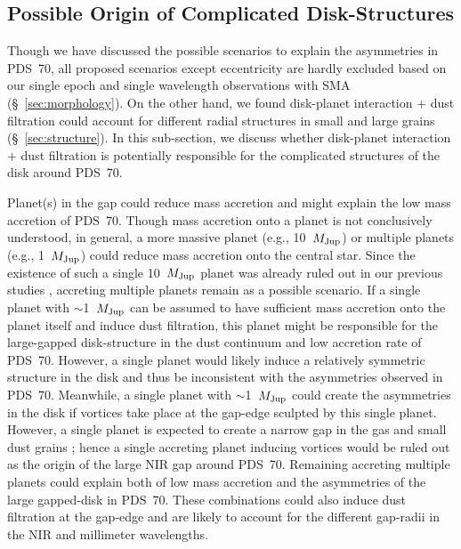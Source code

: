 \documentclass[apj]{emulateapj-rtx4}
\begin{document}
  \subsection{Possible Origin of Complicated Disk-Structures}\label{sec:origin} 

  Though we have discussed the possible scenarios to explain the asymmetries in PDS~70, all proposed scenarios 
  except eccentricity are hardly excluded based on our single epoch and single wavelength observations with SMA 
  (\S~\ref{sec:morphology}).
  On the other hand, we found disk-planet interaction $+$ dust filtration could account for different radial structures
  in small and large grains (\S~\ref{sec:structure}).
  In this sub-section, we discuss whether disk-planet interaction $+$ dust filtration is potentially responsible for
  the complicated structures of the disk around PDS~70.

  Planet(s) in the gap could reduce mass accretion and might explain the low mass accretion of PDS~70. 
  Though mass 
  accretion onto a planet is not conclusively understood, in general, a more massive planet (e.g., 10~$M_{\rm Jup}$) 
  or multiple planets (e.g., 1~$M_{\rm Jup}$) could reduce mass accretion onto the central star. 
  Since the existence of such a single 10~$M_{\rm Jup}$ planet was already ruled out in our previous studies \citep{hash12},
  accreting multiple planets remain as a possible scenario. 
  If a single planet with $\sim$1~$M_{\rm Jup}$ can be assumed to have sufficient mass accretion onto the planet itself
  and induce dust filtration, 
  this planet might be responsible for the large-gapped disk-structure in the dust continuum \citep{pini12}
  and low accretion rate of PDS~70. 
  However, a single planet would likely induce a relatively symmetric structure in the disk \citep{kley12} and thus be 
  inconsistent with the asymmetries observed in PDS~70. Meanwhile, a single planet with $\sim$1~$M_{\rm Jup}$ 
  could create the asymmetries in the disk if vortices take place at the gap-edge sculpted by this single planet. 
  However, a single planet is expected to create a narrow gap in the gas and small dust grains 
  \citep[i.e., $r\lesssim$15~AU;][]{zhu11,dods11}; 
  hence a single accreting planet inducing vortices would be ruled out as the origin of the large NIR gap around PDS~70. 
  Remaining accreting multiple planets could explain both of low mass accretion and the asymmetries of the large gapped-disk in PDS~70. 
  These combinations could also induce dust filtration at the gap-edge and are likely to account for 
  the different gap-radii in the NIR and millimeter wavelengths.
\end{document}
